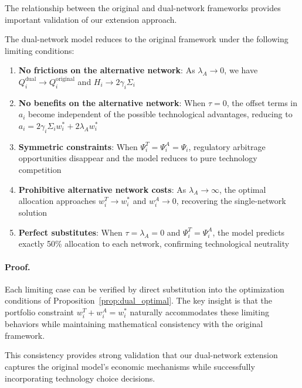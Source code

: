 The relationship between the original and dual-network frameworks provides important validation of our extension approach.

\begin{proposition}
\label{prop:consistency}
The dual-network model reduces to the original framework under the following limiting conditions:
\begin{enumerate}
   \item \textbf{No frictions on the alternative network}: As $\lambda_A \to 0$, we have $Q_i^{\text{dual}} \to Q_i^{\text{original}}$ and $H_i \to 2\gamma_i\Sigma_i$
   
   \item \textbf{No benefits on the alternative network}: When $\tau = 0$, the offset terms in $a_i$ become independent of the possible technological advantages, reducing to $a_i = 2\gamma_i\Sigma_i w_i^* + 2\lambda_A w_i^*$
   
   \item \textbf{Symmetric constraints}: When $\Psi_i^T = \Psi_i^A = \Psi_i$, regulatory arbitrage opportunities disappear and the model reduces to pure technology competition
   
   \item \textbf{Prohibitive alternative network costs}: As $\lambda_A \to \infty$, the optimal allocation approaches $w_i^T \to w_i^*$ and $w_i^A \to 0$, recovering the single-network solution
   
   \item \textbf{Perfect substitutes}: When $\tau = \lambda_A = 0$ and $\Psi_i^T = \Psi_i^A$, the model predicts exactly 50\% allocation to each network, confirming technological neutrality
\end{enumerate}
\end{proposition}

\paragraph{Proof.} Each limiting case can be verified by direct substitution into the optimization conditions of Proposition~\ref{prop:dual_optimal}. The key insight is that the portfolio constraint $w_i^T + w_i^A = w_i^*$ naturally accommodates these limiting behaviors while maintaining mathematical consistency with the original framework.

This consistency provides strong validation that our dual-network extension captures the original model's economic mechanisms while successfully incorporating technology choice decisions.


